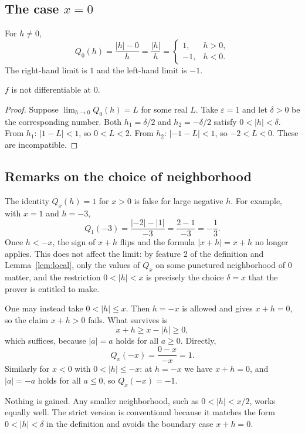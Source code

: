 \documentclass{essay}
\newcommand{\abs}[1]{\lvert #1 \rvert}
\begin{document}
\subsection{The case $x = 0$}

For $h \neq 0$,
\[
  Q_0(h) = \frac{\abs{h} - 0}{h} = \frac{\abs{h}}{h} =
  \begin{cases}
    1,  & h > 0, \\
    -1, & h < 0.
  \end{cases}
\]
The right-hand limit is $1$ and the left-hand limit is $-1$.

\begin{proposition}
  $f$ is not differentiable at $0$.
\end{proposition}

\begin{proof}
  Suppose $\lim_{h \to 0} Q_0(h) = L$ for some real $L$. Take $\varepsilon = 1$
  and let $\delta > 0$ be the corresponding number. Both $h_1 = \delta/2$ and
  $h_2 = -\delta/2$ satisfy $0 < \abs{h} < \delta$. From $h_1$:
  $\abs{1 - L} < 1$, so $0 < L < 2$. From $h_2$: $\abs{-1 - L} < 1$, so
  $-2 < L < 0$. These are incompatible.
\end{proof}

\subsection{Remarks on the choice of neighborhood}

\begin{remark}
  The identity $Q_x(h) = 1$ for $x > 0$ is false for large negative $h$.
  For example, with $x = 1$ and $h = -3$,
  \[
    Q_1(-3) = \frac{\abs{-2} - \abs{1}}{-3} = \frac{2 - 1}{-3} = -\frac{1}{3}.
  \]
  Once $h < -x$, the sign of $x + h$ flips and the formula
  $\abs{x+h} = x + h$ no longer applies. This does not affect the limit:
  by feature 2 of the definition and Lemma~\ref{lem:local}, only the values of
  $Q_x$ on some punctured neighborhood of $0$ matter, and the restriction
  $0 < \abs{h} < x$ is precisely the choice $\delta = x$ that the prover is
  entitled to make.
\end{remark}

\begin{remark}
  One may instead take $0 < \abs{h} \leq x$. Then $h = -x$ is allowed and gives
  $x + h = 0$, so the claim $x + h > 0$ fails. What survives is
  \[
    x + h \geq x - \abs{h} \geq 0,
  \]
  which suffices, because $\abs{a} = a$ holds for all $a \geq 0$. Directly,
  \[
    Q_x(-x) = \frac{0 - x}{-x} = 1.
  \]
  Similarly for $x < 0$ with $0 < \abs{h} \leq -x$: at $h = -x$ we have
  $x + h = 0$, and $\abs{a} = -a$ holds for all $a \leq 0$, so $Q_x(-x) = -1$.

  Nothing is gained. Any smaller neighborhood, such as
  $0 < \abs{h} < x/2$, works equally well. The strict version is conventional
  because it matches the form $0 < \abs{h} < \delta$ in the definition and
  avoids the boundary case $x + h = 0$.
\end{remark}
\end{document}
